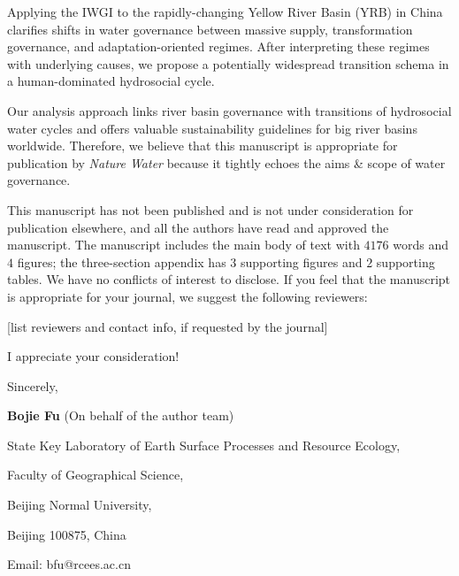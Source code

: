 \documentclass[11pt,a4paper,roman]{moderncv}
\begin{document}
Applying the IWGI to the rapidly-changing Yellow River Basin (YRB) in China clarifies shifts in water governance between massive supply, transformation governance, and adaptation-oriented regimes. After interpreting these regimes with underlying causes, we propose a potentially widespread transition schema in a human-dominated hydrosocial cycle.

Our analysis approach links river basin governance with transitions of hydrosocial water cycles and offers valuable sustainability guidelines for big river basins worldwide. Therefore, we believe that this manuscript is appropriate for publication by \textit{Nature Water} because it tightly echoes the aims \& scope of water governance.

This manuscript has not been published and is not under consideration for publication elsewhere, and all the authors have read and approved the manuscript. The manuscript includes the main body of text with $4176$ words and $4$ figures; the three-section appendix has $3$ supporting figures and $2$ supporting tables. We have no conflicts of interest to disclose. If you feel that the manuscript is appropriate for your journal, we suggest the following reviewers:

[list reviewers and contact info, if requested by the journal]

\vspace{0.5cm}

I appreciate your consideration!

\vspace{0.5cm}

Sincerely,

\textbf{Bojie Fu} (On behalf of the author team)


State Key Laboratory of Earth Surface Processes and Resource Ecology,

Faculty of Geographical Science,

Beijing Normal University,

Beijing 100875, China

Email: bfu@rcees.ac.cn
\end{document}
